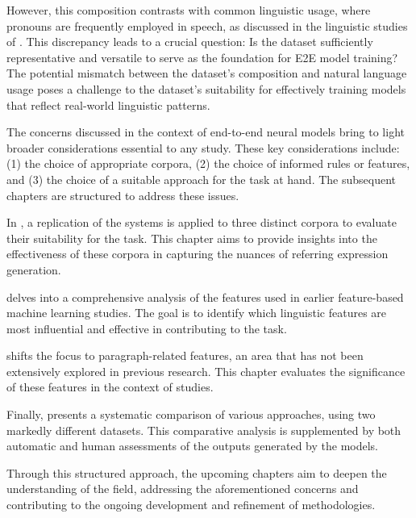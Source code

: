 However, this composition contrasts with common linguistic usage, where pronouns are frequently employed in speech, as discussed in the linguistic studies of . This discrepancy leads to a crucial question: Is the \webnlg dataset sufficiently representative and versatile to serve as the foundation for E2E \context model training? The potential mismatch between the dataset's composition and natural language usage poses a challenge to the dataset's suitability for effectively training models that reflect real-world linguistic patterns.

The concerns discussed in the context of end-to-end neural models bring to light broader considerations essential to any \context study. These key considerations include: (1) the choice of appropriate corpora, (2) the choice of informed rules or features, and (3) the choice of a suitable approach for the task at hand. The subsequent chapters are structured to address these issues.

In , a replication of the \grec systems is applied to three distinct corpora to evaluate their suitability for the \context task. This chapter aims to provide insights into the effectiveness of these corpora in capturing the nuances of referring expression generation.

 delves into a comprehensive analysis of the features used in earlier feature-based machine learning studies. The goal is to identify which linguistic features are most influential and effective in contributing to the \context task.

 shifts the focus to paragraph-related features, an area that has not been extensively explored in previous research. This chapter evaluates the significance of these features in the context of \context studies.

Finally,  presents a systematic comparison of various \context approaches, using two markedly different datasets. This comparative analysis is supplemented by both automatic and human assessments of the outputs generated by the models.

Through this structured approach, the upcoming chapters aim to deepen the understanding of the \context field, addressing the aforementioned concerns and contributing to the ongoing development and refinement of \context methodologies.

